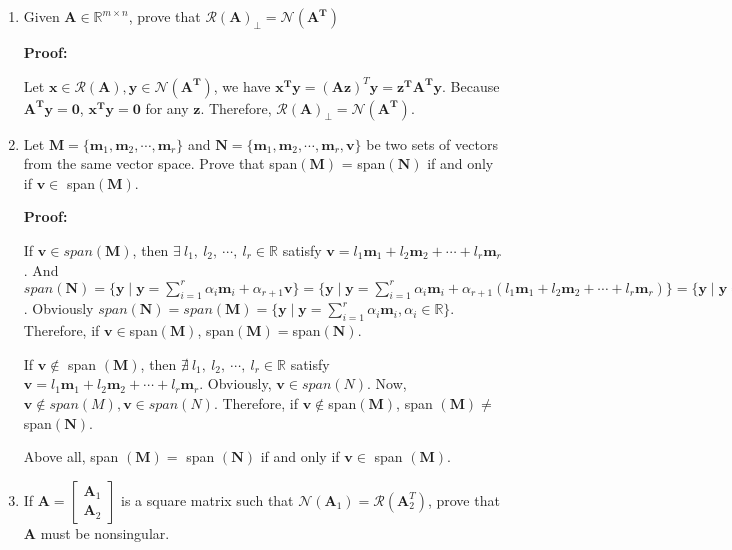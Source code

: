 \documentclass[12pt, letterpaper, onecolumn]{article}
\begin{document}
\begin{enumerate}[start=2]
{\begin{enumerate}
                Conclution: $\mathcal{N}$ is a subspace.

			\end{enumerate}
			}

		\item Given $\bm{A}\in\mathbb{R}^{m\times n}$, prove that $\mathcal{R}(\bm{A})_{\bot}=\mathcal{N}(\bm{A^T})$ %
		
		\textbf{Proof:}
		
        Let $\bm{x} \in \mathcal{R}(\bm{A}), \bm{y} \in \mathcal{N}(\bm{A^T})$, we have $\bm{x^T} \bm{y} = (\bm{Az})^T\bm{y} = \bm{z^TA^Ty}$. Because $\bm{A^Ty} = \bm{0}$, $\bm{x^T} \bm{y} = \bm{0}$ for any $\bm{z}$. Therefore, $\mathcal{R}(\bm{A})_{\bot}=\mathcal{N}(\bm{A^T})$.

		\item Let $\bm{M}=\{\bm{m}_1,\bm{m}_2,\cdots,\bm{m}_r\}$ and $\bm{N}=\{\bm{m}_1,\bm{m}_2,\cdots,\bm{m}_r,\bm{v}\}$ 
		be two sets of vectors from the same vector space. 
		Prove that span$(\bm{M})$ = span$(\bm{N})$ if and only if $\bm{v}\in$ span$(\bm{M})$.%

		\textbf{Proof:}

        If $\bm{v}\in span(\bm{M})$, then $\exists\ l_{1},\ l_{2},\ \cdots,\ l_{r}\in\mathbb{R}$ satisfy $\bm{v}=l_{1}\bm{m}_{1}+l_{2}\bm{m}_{2}+\cdots+l_{r}\bm{m}_{r}$. And $span(\bm{N})=\{\bm{y}\mid\bm{y}=\sum\limits_{i=1}^{r}\alpha_{i}\bm{m}_{i}+\alpha_{r+1}\bm{v}\}= \{\bm{y}\mid\bm{y}=\sum\limits_{i=1}^{r}\alpha_{i}\bm{m}_{i}+\alpha_{r+1}(l_{1}\bm{m}_{1}+l_{2}\bm{m}_{2}+\cdots+l_{r}\bm{m}_{r})\}= \{\bm{y}\mid\bm{y}=\sum\limits_{i=1}^{r}\beta_{i}\bm{m}_{i},\beta_{i}=\alpha_{i}+\alpha_{r+1}l_{i}\in\mathbb{R}\}$. Obviously $span(\bm{N}) = span(\bm{M}) =\{\bm{y}\mid\bm{y}=\sum\limits_{i=1}^{r}\alpha_{i}\bm{m}_{i},\alpha_{i}\in\mathbb{R}\}$. Therefore, if $\bm{v}\in$span$ (\bm{M}) $, span$ (\bm{M})=$span$ (\bm{N})$.

        If $\bm{v}\notin $ span $ (\bm{M}) $, then $\nexists\ l_{1},\ l_{2},\ \cdots,\ l_{r}\in\mathbb{R}$ satisfy $\bm{v}=l_{1}\bm{m}_{1}+l_{2}\bm{m}_{2}+\cdots+l_{r}\bm{m}_{r}$. Obviously, $\bm{v} \in span(N)$. Now, $\bm{v} \notin span(M), \bm{v} \in span(N)$. Therefore, if $\bm{v}\notin$span$(\bm{M})$, span $(\bm{M})\neq$span$(\bm{N})$.
		
		Above all, span $(\bm{M})=$ span $(\bm{N})$ if and only if $\bm{v}\in$ span $(\bm{M})$.

		\item If 
		$
		\bm{A}=
		\begin{bmatrix}
			\bm{A}_1 \\ \bm{A}_2
		\end{bmatrix}
		$
		is a square matrix such that $\mathcal{N}(\bm{A}_1)=\mathcal{R}(\bm{A}^T_2)$, prove that $\bm{A}$ must be nonsingular.%


\end{enumerate}
\end{document}

